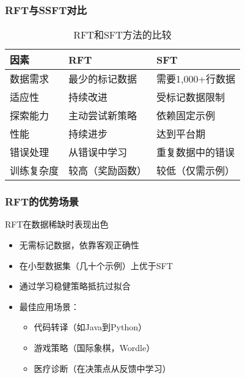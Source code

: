 \documentclass[aspectratio=169]{beamer}
\begin{document}
\begin{frame}
	\frametitle{RFT与SSFT对比}
	\begin{table}
		\footnotesize
		\begin{tabular}{|p{3cm}|p{3cm}|p{3cm}|}
			\hline
			\textbf{因素} & \textbf{RFT} & \textbf{SFT} \\
			\hline
			数据需求 & 最少的标记数据 & 需要1,000+行数据 \\
			\hline
			适应性 & 持续改进 & 受标记数据限制 \\
			\hline
			探索能力 & 主动尝试新策略 & 依赖固定示例 \\
			\hline
			性能 & 持续进步 & 达到平台期 \\
			\hline
			错误处理 & 从错误中学习 & 重复数据中的错误 \\
			\hline
			训练复杂度 & 较高（奖励函数） & 较低（仅需示例） \\
			\hline
		\end{tabular}
		\caption{RFT和SFT方法的比较}
	\end{table}
\end{frame}

\begin{frame}
	\frametitle{RFT的优势场景}
	\begin{block}{RFT在数据稀缺时表现出色}
		\begin{itemize}
			\item 无需标记数据，依靠客观正确性
			\item 在小型数据集（几十个示例）上优于SFT
			\item 通过学习稳健策略抵抗过拟合
			\item 最佳应用场景：
			\begin{itemize}
				\item 代码转译（如Java到Python）
				\item 游戏策略（国际象棋，Wordle）
				\item 医疗诊断（在决策点从反馈中学习）
			\end{itemize}
			\end{itemize}
		\end{block}
\end{frame}
\end{document}
